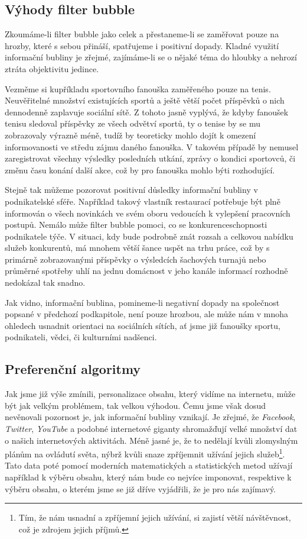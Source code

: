 \documentclass[12pt, a4paper]{article}
\numberwithin{equation}{section} 	%
\begin{document}
\subsection{Výhody filter bubble}
\noindent Zkoumáme-li filter bubble jako celek a přestaneme-li se zaměřovat pouze na hrozby, které s sebou přináší, spatřujeme i positivní dopady. Kladné využití informační bubliny je zřejmé, zajímáme-li se o nějaké téma do hloubky a nehrozí ztráta objektivitu jedince.

Vezměme si kupříkladu sportovního fanouška zaměřeného pouze na tenis. Neuvěřitelné množství existujících sportů a ještě větší počet příspěvků o nich dennodenně zaplavuje sociální sítě. Z tohoto jasně vyplývá, že kdyby fanoušek tenisu sledoval příspěvky ze všech odvětví sportů, ty o tenise by se mu zobrazovaly výrazně méně, tudíž by teoreticky mohlo dojít k omezení informovanosti ve středu zájmu daného fanouška. V takovém případě by nemusel zaregistrovat všechny výsledky posledních utkání, zprávy o kondici sportovců, či změnu času konání další akce, což by pro fanouška mohlo býti rozhodující.

Stejně tak můžeme pozorovat positivní důsledky informační bubliny v podnikatelské sféře. Například takový vlastník restaurací potřebuje být plně informován o všech novinkách ve svém oboru vedoucích k vylepšení pracovních postupů. Nemálo může filter bubble pomoci, co se konkurenceschopnosti podnikatele týče. V situaci, kdy bude podrobně znát rozsah a celkovou nabídku služeb konkurentů, má mnohem větší šance uspět na trhu práce, což by s primárně zobrazovanými příspěvky o výsledcích šachových turnajů nebo průměrné spotřeby uhlí na jednu domácnost v jeho kanále informací rozhodně nedokázal tak snadno.

Jak vidno, informační bublina, pomineme-li negativní dopady na společnost popsané v předchozí podkapitole, není pouze hrozbou, ale může nám v mnoha ohledech usnadnit orientaci na sociálních sítích, ať jsme již fanoušky sportu, podnikateli, vědci, či kulturními nadšenci.

\subsection{Preferenční algoritmy}
\noindent Jak jsme již výše zmínili, personalizace obsahu, který vidíme na internetu, může být jak velkým problémem, tak velkou výhodou. Čemu jsme však dosud nevěnovali pozornost je, jak informační bubliny vznikají. Je zřejmé, že \textit{Facebook}, \textit{Twitter}, \textit{YouTube} a podobné internetové giganty shromažďují velké množství dat o našich internetových aktivitách. Méně jasné je, že to nedělají kvůli zlomyslným plánům na ovládutí světa, nýbrž kvůli snaze zpříjemnit užívání jejich služeb\footnote{Tím, že nám usnadní a zpříjemní jejich užívání, si zajistí větší návštěvnost, což je zdrojem jejich příjmů.}. Tato data poté pomocí moderních matematických a statistických metod užívají například k výběru obsahu, který nám bude co nejvíce imponovat, respektive k výběru obsahu, o kterém jsme se již dříve vyjádřili, že je pro nás zajímavý.
\end{document}
